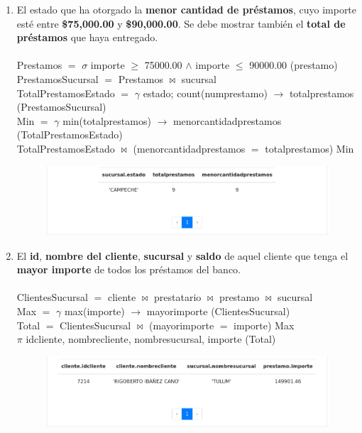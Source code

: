 \documentclass{exam}
\begin{document}
\begin{questions}
\begin{enumerate}[label=\alph*.]
		\newpage
		\item El estado que ha otorgado la \textbf{menor cantidad de préstamos}, cuyo importe esté entre \textbf{\$75,000.00} y \textbf{\$90,000.00}. Se debe mostrar también el \textbf{total de préstamos} que haya entregado.\\\\
		Prestamos $=$ $\sigma$ importe $\geqslant$ 75000.00 $\wedge$ importe  $\leqslant$ 90000.00 (prestamo)\\
		PrestamosSucursal $=$ Prestamos $\bowtie$ sucursal\\
		TotalPrestamosEstado $=$ $\gamma$ estado; count(numprestamo) $\longrightarrow$ totalprestamos (PrestamosSucursal)\\
		Min $=$ $\gamma$ min(totalprestamos) $\longrightarrow$ menorcantidadprestamos  (TotalPrestamosEstado)\\
		TotalPrestamosEstado $\bowtie$ (menorcantidadprestamos $=$ totalprestamos)  Min\\
		\begin{center}
		\begin{figure}[h!]
			\includegraphics[width=17cm]{imgs/2i.png}
			\centering
		\end{figure}	
		\end{center}
		
		
		\newpage
		\item El \textbf{id}, \textbf{nombre del cliente}, \textbf{sucursal} y \textbf{saldo} de aquel cliente que tenga el \textbf{mayor importe} de todos los préstamos del
banco.\\\\
		ClientesSucursal $=$ cliente $\bowtie$ prestatario $\bowtie$ prestamo $\bowtie$ sucursal\\
		Max $=$ $\gamma$ max(importe) $\longrightarrow$ mayorimporte (ClientesSucursal)\\
		Total $=$ ClientesSucursal $\bowtie$ (mayorimporte $=$ importe) Max\\
		$\pi$ idcliente, nombrecliente, nombresucursal, importe (Total)\\
		\begin{center}
		\begin{figure}[h!]
			\includegraphics[width=17cm]{imgs/2j.png}
			\centering
		\end{figure}	
		\end{center}
		


\end{enumerate}
\end{questions}
\end{document}

